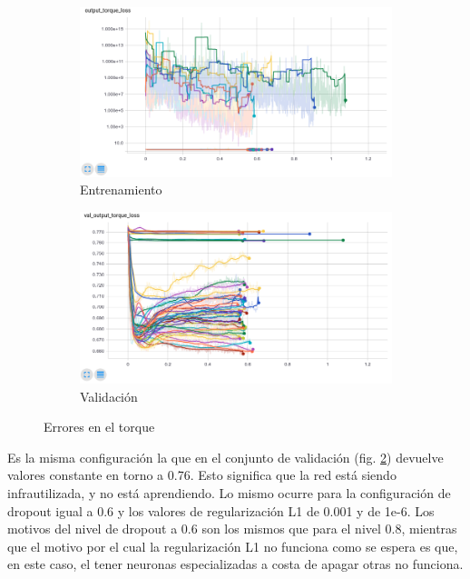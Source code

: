 \begin{figure}
	\begin{subfigure}{0.45\textwidth}
		\centering
		\includegraphics[width=\linewidth]{imagenes/resultados/torque_loss_all.png}
		\caption{Entrenamiento}
		\label{fig:resultados/torque_loss_all}
	\end{subfigure}
	\begin{subfigure}{0.45\textwidth}
		\centering
		\includegraphics[width=\linewidth]{imagenes/resultados/val_torque_loss_all.png}
		\caption{Validación}
		\label{fig:resultados/val_torque_loss_all}
	\end{subfigure}
	\caption{Errores en el torque}
	\label{fig:resultados/torque_all}
\end{figure}

Es la misma configuración la que en el conjunto de validación (fig. \ref{fig:resultados/val_torque_loss_all}) devuelve valores constante en torno a 0.76. Esto significa que la red está siendo infrautilizada, y no está aprendiendo. Lo mismo ocurre para la configuración de dropout igual a 0.6 y los valores de regularización L1 de 0.001 y de 1e-6. Los motivos del nivel de dropout a 0.6 son los mismos que para el nivel 0.8, mientras que el motivo por el cual la regularización L1 no funciona como se espera es que, en este caso, el tener neuronas especializadas a costa de apagar otras no funciona.

